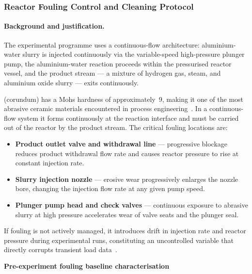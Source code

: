 \documentclass[12pt]{article}
\begin{document}
\subsubsection{Reactor Fouling Control and Cleaning Protocol}
\label{app:fouling-control}

\paragraph{Background and justification.}

The experimental programme uses a continuous-flow architecture: aluminium-water
slurry is injected continuously via the variable-speed high-pressure plunger pump,
the aluminium-water reaction proceeds within the pressurised reactor vessel, and the
product stream --- a mixture of hydrogen gas, steam, and aluminium oxide slurry ---
exits continuously.

 (corundum) has a Mohs hardness of approximately~9, making it one of the
most abrasive ceramic materials encountered in process
engineering~\cite{finnie1960}. In a continuous-flow system it forms continuously at
the reaction interface and must be carried out of the reactor by the product stream.
The critical fouling locations are:

\begin{itemize}[itemsep=4pt]
    \item \textbf{Product outlet valve and withdrawal line} --- progressive
          blockage reduces product withdrawal flow rate and causes reactor pressure
          to rise at constant injection rate.
    \item \textbf{Slurry injection nozzle} --- erosive wear progressively
          enlarges the nozzle bore, changing the injection flow rate at any given
          pump speed.
    \item \textbf{Plunger pump head and check valves} --- continuous exposure to
          abrasive slurry at high pressure accelerates wear of valve seats and the
          plunger seal.
\end{itemize}

If fouling is not actively managed, it introduces drift in injection rate and reactor
pressure during experimental runs, constituting an uncontrolled variable that
directly corrupts transient load data~\cite{levenspiel1999}.

\bigskip
\noindent\textbf{Pre-experiment fouling baseline characterisation}
\end{document}
